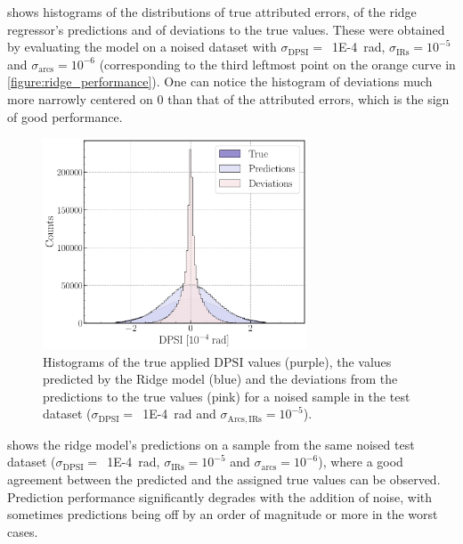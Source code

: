  shows histograms of the distributions of true attributed errors, of the ridge regressor's predictions and of deviations to the true values.
These were obtained by evaluating the model on a noised dataset with \(\sigma_{\mathrm{DPSI}} =\)~\qty{1E-4}{\radian}, \(\sigma_{\mathrm{IRs}} = 10^{-5}\) and \(\sigma_{\mathrm{arcs}} = 10^{-6}\) (corresponding to the third leftmost point on the \textcolor{mplorange}{orange} curve in \cref{figure:ridge_performance}).
One can notice the histogram of deviations much more narrowly centered on \num{0} than that of the attributed errors, which is the sign of good performance.

\begin{figure}[!htb]
    \centering
    \includegraphics*[width=0.7\textwidth]{Figures/ML_for_IR_Coupling/ridge_histograms.pdf}
    \caption{Histograms of the true applied \(\mathrm{DPSI}\) values (\textcolor{ridgepurple}{purple}), the values predicted by the Ridge model (\textcolor{ridgeblue}{blue}) and the deviations from the predictions to the true values (\textcolor{ridgesalmon}{pink}) for a noised sample in the test dataset (\(\sigma_{\mathrm{DPSI}} =\)~\qty{1E-4}{\radian} and \(\sigma_{\mathrm{Arcs, IRs}} = 10^{-5}\)).}
    \label{figure:ridge_histograms}
\end{figure}

 shows the ridge model's predictions on a sample from the same noised test dataset (\(\sigma_{\mathrm{DPSI}} =\)~\qty{1E-4}{\radian}, \(\sigma_{\mathrm{IRs}} = 10^{-5}\) and \(\sigma_{\mathrm{arcs}} = 10^{-6}\)), where a good agreement between the predicted and the assigned true values can be observed.
Prediction performance significantly degrades with the addition of noise, with sometimes predictions being off by an order of magnitude or more in the worst cases.

